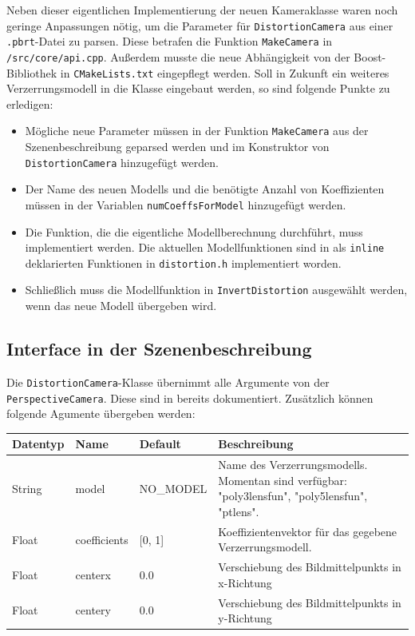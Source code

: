 Neben dieser eigentlichen Implementierung der neuen Kameraklasse waren noch geringe Anpassungen nötig, um die Parameter für \texttt{DistortionCamera} aus einer \texttt{.pbrt}-Datei zu parsen. Diese betrafen die Funktion \texttt{MakeCamera} in \texttt{/src/core/api.cpp}. Außerdem musste die neue Abhängigkeit von der Boost-Bibliothek in \texttt{CMakeLists.txt} eingepflegt werden. Soll in Zukunft ein weiteres Verzerrungsmodell in die Klasse eingebaut werden, so sind folgende Punkte zu erledigen:
\begin{itemize}
	\item Mögliche neue Parameter müssen in der Funktion \texttt{MakeCamera} aus der Szenenbeschreibung geparsed werden und im Konstruktor von \texttt{DistortionCamera} hinzugefügt werden.
	\item Der Name des neuen Modells und die benötigte Anzahl von Koeffizienten müssen in der Variablen \texttt{numCoeffsForModel} hinzugefügt werden.
	\item Die Funktion, die die eigentliche Modellberechnung durchführt, muss implementiert werden. Die aktuellen Modellfunktionen sind in als \texttt{inline} deklarierten Funktionen in \texttt{distortion.h} implementiert worden.
	\item Schließlich muss die Modellfunktion in \texttt{InvertDistortion} ausgewählt werden, wenn das neue Modell übergeben wird.
\end{itemize}

\subsection{Interface in der Szenenbeschreibung}

Die \texttt{DistortionCamera}-Klasse übernimmt alle Argumente von der \texttt{PerspectiveCamera}. Diese sind in \cite{pbrt_file} bereits dokumentiert. Zusätzlich können folgende Agumente übergeben werden:
\begin{table}[h]
	\begin{tabularx}{\textwidth}{l|l|l|X}
		\textbf{Datentyp} & \textbf{Name} & \textbf{Default} & \textbf{Beschreibung} \\ \hline \hline
		String & model & NO\_MODEL & Name des Verzerrungsmodells. Momentan sind verfügbar: "poly3lensfun", \mbox{"poly5lensfun"}, "ptlens".\\
		Float & coefficients & [0, 1] & Koeffizientenvektor für das gegebene Verzerrungsmodell. \\
		Float & centerx & 0.0 & Verschiebung des Bildmittelpunkts in \mbox{x-Richtung} \\
		Float & centery & 0.0 & Verschiebung des Bildmittelpunkts in \mbox{y-Richtung}
	\end{tabularx}
\end{table}